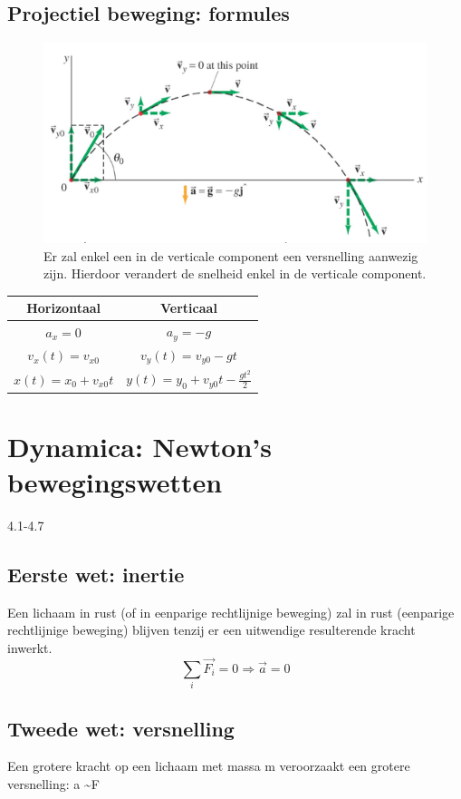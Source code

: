 \documentclass[12pt,a4paper]{article}
\begin{document}
	\subsection{Projectiel beweging: formules}
	\begin{figure}[h]
		\centering
		\includegraphics[width=0.7\linewidth]{projectiel}
		\caption{Er zal enkel een in de verticale component een versnelling aanwezig zijn. Hierdoor verandert de snelheid enkel in de verticale component.}
		\label{projectiel}
	\end{figure}
\begin{table}[h]
	\centering
	\begin{tabular}{|c|c|}
		\hline
		\textbf{Horizontaal} & \textbf{Verticaal} \\
		\hline
		\(a_x = 0\)&\(a_y = -g\)  \\
		\hline
		\(v_x(t) = v_{x0}\)&\(v_y(t) = v_{y0} - gt\)  \\
		\hline
		\(x(t) = x_0 + v_{x0}t\)&\(y(t) = y_0 + v_{y0}t - \frac{gt^2}{2}\)  \\
		\hline
	\end{tabular}
\end{table}
	\section{Dynamica: Newton's bewegingswetten}
	4.1-4.7
	\subsection{Eerste wet: inertie}
	Een lichaam in rust (of in eenparige rechtlijnige beweging) zal in rust (eenparige rechtlijnige beweging) blijven tenzij er een uitwendige resulterende kracht inwerkt.
	\[\sum_{i}\vec{F_i} = 0 \Rightarrow \vec{a} = 0\]
	\subsection{Tweede wet: versnelling}
	Een grotere kracht op een lichaam met massa m veroorzaakt een grotere versnelling: a \textasciitilde F
	
\end{document}
